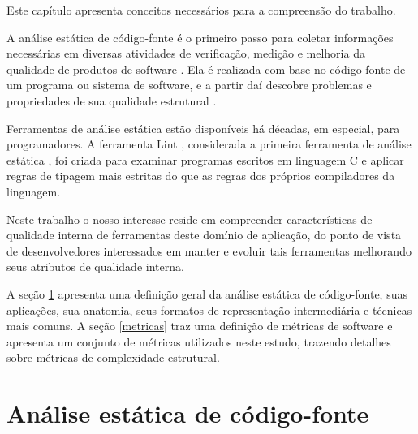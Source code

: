 
{Este capítulo apresenta conceitos necessários para a compreensão do trabalho.}
\label{fundamentacao}

A análise estática de código-fonte é o primeiro passo para coletar informações
necessárias em diversas atividades de verificação, medição e melhoria da
qualidade de produtos de software \cite{Cruz2009} \cite{Kirkov2010}. Ela é
realizada com base no código-fonte de um programa ou sistema de software, e a
partir daí descobre problemas e propriedades de sua qualidade estrutural
\cite{Chess2007}.

Ferramentas de análise estática estão disponíveis há décadas, em especial,
para programadores. A ferramenta Lint \cite{Johnson1978}, considerada a
primeira ferramenta de análise estática \cite{Gosain2015}, foi criada para
examinar programas escritos em linguagem C e aplicar regras de tipagem mais
estritas do que as regras dos próprios compiladores da linguagem.

Neste trabalho o nosso interesse reside em compreender características de
qualidade interna de ferramentas deste domínio de aplicação, do ponto
de vista de desenvolvedores interessados em manter e evoluir tais ferramentas
melhorando seus atributos de qualidade interna.

A seção \ref{analise-estatica} apresenta uma definição geral da análise
estática de código-fonte, suas aplicações, sua anatomia, seus formatos de
representação intermediária e técnicas mais comuns. A seção \ref{metricas} traz uma
definição de métricas de software e apresenta um conjunto de métricas
utilizados neste estudo, trazendo detalhes sobre métricas de complexidade
estrutural.

\section{Análise estática de código-fonte} \label{analise-estatica}

